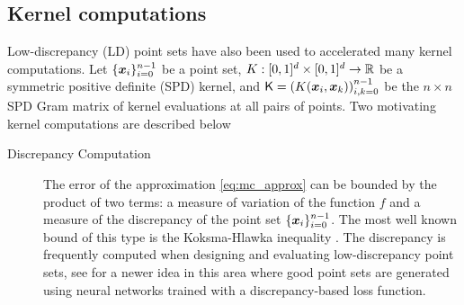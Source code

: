 \documentclass[acmsmall]{acmart}
\begin{document}
\subsection{Kernel computations} 

Low-discrepancy (LD) point sets have also been used to accelerated many kernel computations. Let $\{{\boldsymbol{x}}_i\}_{i=0}^{n-1}$ be a point set, $K: [0,1]^d \times [0,1]^d \to {\mathbb{R}}$ be a symmetric positive definite (SPD) kernel, and ${\mathsf{K}} = \left(K({\boldsymbol{x}}_i,{\boldsymbol{x}}_k)\right)_{i,k=0}^{n-1}$ be the $n \times n$ SPD Gram matrix of kernel evaluations at all pairs of points. Two motivating kernel computations are described below

\begin{description}
    \item[Discrepancy Computation] The error of the approximation \eqref{eq:mc_approx} can be bounded by the product of two terms: a measure of variation of the function $f$ and a measure of the discrepancy of the point set $\{{\boldsymbol{x}}_i\}_{i=0}^{n-1}$.  The most well known bound of this type is the Koksma-Hlawka inequality \citep{hickernell.generalized_discrepancy_quadrature_error_bound,dick.high_dim_integration_qmc_way,hickernell1999goodness,niederreiter.qmc_book}. The discrepancy is frequently computed when designing and evaluating low-discrepancy point sets, see \citep{rusch2024message} for a newer idea in this area where good point sets are generated using neural networks trained with a discrepancy-based loss function.  
    

\end{description}
\end{document}
